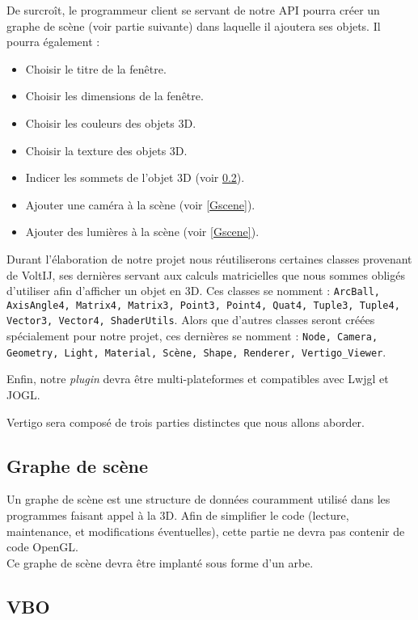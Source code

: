 \documentclass[11pt]{report}
\begin{document}
De surcroît, le programmeur client se servant de notre API pourra créer un graphe de scène (voir partie suivante) dans laquelle il ajoutera ses objets. 
Il pourra également :
\begin{itemize}
\item Choisir le titre de la fenêtre.
\item Choisir les dimensions de la fenêtre.
\item Choisir les couleurs des objets 3D.
\item Choisir la texture des objets 3D.
\item Indicer les sommets de l'objet 3D (voir \ref{VBO}).
\item Ajouter une caméra à la scène (voir \ref{Gscene}).
\item Ajouter des lumières à la scène (voir \ref{Gscene}).
\end{itemize}

Durant l'élaboration de notre projet nous réutiliserons certaines classes provenant de VoltIJ, ses dernières servant aux calculs matricielles que nous sommes obligés d'utiliser afin d'afficher un objet en 3D. Ces classes se nomment : \texttt{ArcBall, AxisAngle4, Matrix4, Matrix3, Point3, Point4, Quat4, Tuple3, Tuple4, Vector3, Vector4, ShaderUtils}.
Alors que d'autres classes seront créées spécialement pour notre projet, ces dernières se nomment : \texttt{Node, Camera, Geometry, Light, Material, Scène, Shape, Renderer, Vertigo\_Viewer}.

Enfin, notre \textit{plugin} devra être multi-plateformes et compatibles avec Lwjgl et JOGL.

Vertigo sera composé de trois parties distinctes que nous allons aborder.
\subsection{Graphe de scène} \label{gScene}
Un graphe de scène est une structure de données couramment utilisé dans les programmes faisant appel à la 3D.
Afin de simplifier le code (lecture, maintenance, et modifications éventuelles), cette partie ne devra pas contenir de code OpenGL.\\
Ce graphe de scène devra être implanté sous forme d'un arbe. 
\subsection{VBO} 
\label{VBO}%
\end{document}
